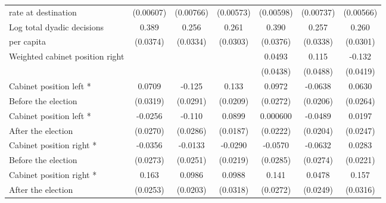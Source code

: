 \begin{table}[htbp]
\begin{tabular}{l*{6}{c}}
 rate at destination                    &   (0.00607)         &   (0.00766)         &   (0.00573)         &   (0.00598)         &   (0.00737)         &   (0.00566)         \\
[0,5em]
Log total dyadic decisions&       0.389\sym{***}&       0.256\sym{***}&       0.261\sym{***}&       0.390\sym{***}&       0.257\sym{***}&       0.260\sym{***}\\
per capita                    &    (0.0374)         &    (0.0334)         &    (0.0303)         &    (0.0376)         &    (0.0338)         &    (0.0301)         \\
[0,5em]
Weighted cabinet position right&                     &                     &                     &      0.0493         &       0.115\sym{*}  &      -0.132\sym{**} \\
                    &                     &                     &                     &    (0.0438)         &    (0.0488)         &    (0.0419)         \\
[0,5em]
Cabinet position left *&      0.0709\sym{*}  &      -0.125\sym{***}&       0.133\sym{***}&      0.0972\sym{***}&     -0.0638\sym{**} &      0.0630\sym{*}  \\
 Before the election                    &    (0.0319)         &    (0.0291)         &    (0.0209)         &    (0.0272)         &    (0.0206)         &    (0.0264)         \\
[0,5em]
Cabinet position left * &     -0.0256         &      -0.110\sym{***}&      0.0899\sym{***}&    0.000600         &     -0.0489\sym{*}  &      0.0197         \\
After the election                    &    (0.0270)         &    (0.0286)         &    (0.0187)         &    (0.0222)         &    (0.0204)         &    (0.0247)         \\
[0,5em]
Cabinet position right * &     -0.0356         &     -0.0133         &     -0.0290         &     -0.0570         &     -0.0632\sym{*}  &      0.0283         \\
Before the election                    &    (0.0273)         &    (0.0251)         &    (0.0219)         &    (0.0285)         &    (0.0274)         &    (0.0221)         \\
[0,5em]
Cabinet position right *&       0.163\sym{***}&      0.0986\sym{***}&      0.0988\sym{**} &       0.141\sym{***}&      0.0478         &       0.157\sym{***}\\
 After the election                    &    (0.0253)         &    (0.0203)         &    (0.0318)         &    (0.0272)         &    (0.0249)         &    (0.0316)         \\

\end{tabular}
\end{table}
